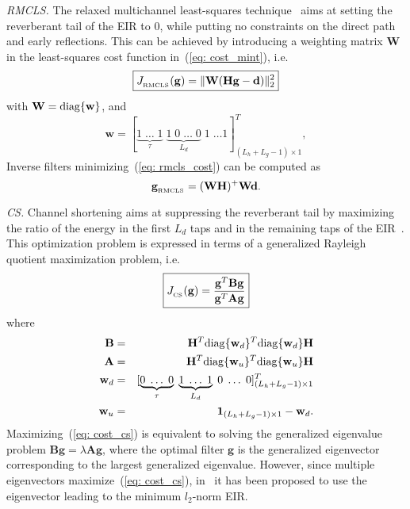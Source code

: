 \documentclass{article}
\begin{document}
\smallskip \noindent \textit{RMCLS.} \enspace The relaxed multichannel least-squares technique~\cite{Zhang_IWAENC_2010} aims at setting the reverberant tail of the EIR to $0$, while putting no constraints on the direct path and early reflections. 
This can be achieved by introducing a weighting matrix $\mathbf{W}$ in the least-squares cost function in~(\ref{eq: cost_mint}), i.e.
\begin{equation}
\label{eq: rmcls_cost}
\boxed{J_{{}_{\rm RMCLS}}(\mathbf{g}) = \|\mathbf{W}({\mathbf{H}}\mathbf{g} - \mathbf{d})\|_2^2}
\end{equation}
with $\mathbf{W} = {\rm diag}\{\mathbf{w}\}$, and
\begin{equation}
\mathbf{w} = [\underbrace{1 \; \ldots \; 1}_{\tau} \; \underbrace{1 \; 0 \; \ldots \; 0}_{L_d} \; 1 \; \ldots 1]_{(L_h+L_g-1) \times 1}^{T},
\end{equation}
Inverse filters minimizing~(\ref{eq: rmcls_cost}) can be computed as
\begin{equation}
\mathbf{g}_{{}_{\rm RMCLS}}= (\mathbf{W}{\mathbf{H}})^{+}\mathbf{W}\mathbf{d}.
\end{equation}

\smallskip \noindent \textit{CS.} \enspace Channel shortening aims at suppressing the reverberant tail by maximizing the ratio of the energy in the first $L_d$ taps and in the remaining taps of the EIR~\cite{Zhang_IWAENC_2010}. 
This optimization problem is expressed in terms of a generalized Rayleigh quotient maximization problem, i.e.
\begin{equation}
\label{eq: cost_cs}
\boxed{J_{{}_{\rm CS}}(\mathbf{g})= \frac{\mathbf{g}^T {\mathbf{B}} \mathbf{g}}{\mathbf{g}^T {\mathbf{A}} \mathbf{g}}}
\end{equation}
where
\begin{eqnarray}
\label{eq: wincs}
{\mathbf{B}} & = & {\mathbf{H}}^{T} {\rm diag}\{\mathbf{w}_d \}^T {\rm diag}\{\mathbf{w}_d \}{\mathbf{H}}  \\
{\mathbf{A}} & = & {\mathbf{H}}^{T} {\rm diag}\{\mathbf{w}_u \}^T {\rm diag}\{\mathbf{w}_u \}{\mathbf{H}}  \\
\mathbf{w}_d & = & [\underbrace{0 \; \ldots \; 0}_{\tau} \; \underbrace{1 \; \ldots \; 1}_{L_{d}}\; 0\; \ldots\; 0]_{(L_h+L_g-1) \times 1}^{T}  \\
\mathbf{w}_u & = & \mathbf{1}_{(L_h+L_g-1)\times 1} - \mathbf{w}_d.
\end{eqnarray}
Maximizing~(\ref{eq: cost_cs}) is equivalent to solving the generalized eigenvalue problem $\mathbf{B} \mathbf{g} = \lambda \mathbf{A} \mathbf{g}$, where the optimal filter $\mathbf{g}$ is the generalized eigenvector corresponding to the largest generalized eigenvalue.
However, since multiple eigenvectors maximize~(\ref{eq: cost_cs}), in~\cite{Zhang_IWAENC_2010} it has been proposed to use the eigenvector leading to the minimum $l_2$-norm EIR.
\vspace{-0.1cm}
\end{document}
